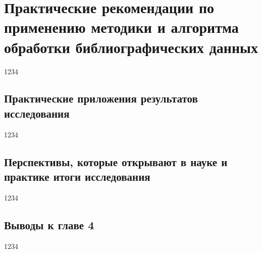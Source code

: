 \chapter{Практические рекомендации по применению методики и алгоритма обработки библиографических данных}
1234
\section{Практические приложения результатов исследования}
1234
\section{Перспективы, которые открывают в науке и практике итоги исследования}
1234
\section*{Выводы к главе 4}
1234